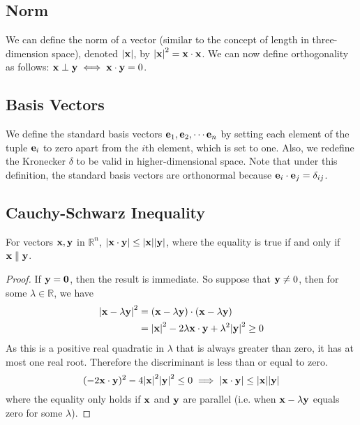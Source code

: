 \documentclass{article}
\begin{document}
\subsection{Norm}
We can define the norm of a vector (similar to the concept of length in three-dimension space), denoted $\abs {\vb x}$, by $\abs{\vb x}^2 = \vb x \cdot \vb x$. We can now define orthogonality as follows: $\vb x \perp \vb y \iff \vb x \cdot \vb y = 0$.

\subsection{Basis Vectors}
We define the standard basis vectors $\vb e_1, \vb e_2, \cdots \vb e_n$ by setting each element of the tuple $\vb e_i$ to zero apart from the $i$th element, which is set to one. Also, we redefine the Kronecker $\delta$ to be valid in higher-dimensional space. Note that under this definition, the standard basis vectors are orthonormal because $\vb e_i \cdot \vb e_j = \delta_{ij}$.

\subsection{Cauchy-Schwarz Inequality}
\begin{proposition}
	For vectors $\vb x, \vb y$ in $\mathbb R^n$, $\abs{\vb x \cdot \vb y} \leq \abs{\vb x} \abs{\vb y}$, where the equality is true if and only if $\vb x \parallel \vb y$.
\end{proposition}
\begin{proof}
	If $\vb y = \vb 0$, then the result is immediate. So suppose that $\vb y \neq 0$, then for some $\lambda \in \mathbb R$, we have
	\begin{align*}
		\abs{\vb x - \lambda \vb y}^2 & =
		(\vb x - \lambda \vb y) \cdot (\vb x - \lambda \vb y)                                                          \\
		                              & = \abs{\vb x}^2 - 2 \lambda \vb x \cdot \vb y + \lambda^2 \abs{\vb y}^2 \geq 0
	\end{align*}
	As this is a positive real quadratic in $\lambda$ that is always greater than zero, it has at most one real root. Therefore the discriminant is less than or equal to zero.
	\[ (-2 \vb x \cdot \vb y)^2 - 4 \abs{\vb x}^2\abs{\vb y}^2 \leq 0
		\implies \abs{\vb x \cdot \vb y} \leq \abs{\vb x}\abs{\vb y} \]
	where the equality only holds if $\vb x$ and $\vb y$ are parallel (i.e. when $\vb x - \lambda \vb y$ equals zero for some $\lambda$).
\end{proof}
\end{document}
